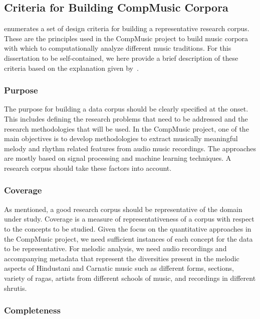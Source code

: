 \subsection{Criteria for Building CompMusic Corpora}
\label{sec:corpus_criterion_for_corpora}

\cite{serra:14:corpus} enumerates a set of design criteria for building a representative research corpus. These are the principles used in the CompMusic project to build music corpora with which to computationally analyze different music traditions. For this dissertation to be self-contained, we here provide a brief description of these criteria based on the explanation given by~\cite{serra:14:corpus}.

\subsubsection{Purpose}

The purpose for building a data corpus should be clearly specified at the onset. This includes defining the research problems that need to be addressed and the research methodologies that will be used. In the CompMusic project, one of the main objectives is to develop methodologies to extract musically meaningful melody and rhythm related features from audio music recordings. The approaches are mostly based on signal processing and machine learning techniques. A research corpus should take these factors into account.

\subsubsection{Coverage}

As mentioned, a good research corpus should be representative of the domain under study. Coverage is a measure of representativeness of a corpus with respect to the concepts to be studied. Given the focus on the quantitative approaches in the CompMusic project, we need sufficient instances of each concept for the data to be representative. For melodic analysis, we need audio recordings and accompanying metadata that represent the diversities present in the melodic aspects of Hindustani and Carnatic music such as different forms, sections, variety of \glspl{raga}, artists from different schools of music, and recordings in different \glspl{shruti}. 

\subsubsection{Completeness}

